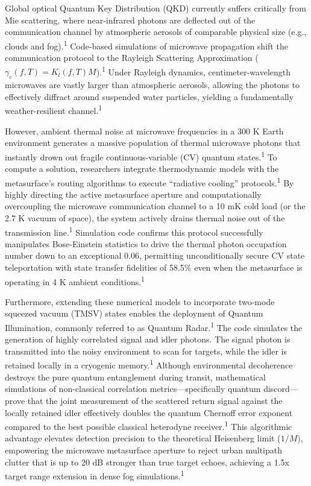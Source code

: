 \documentclass[11pt, a4paper]{article}
\begin{document}
Global optical Quantum Key Distribution (QKD) currently suffers critically from Mie scattering, where near-infrared photons are deflected out of the communication channel by atmospheric aerosols of comparable physical size (e.g., clouds and fog).\textsuperscript{1} Code-based simulations of microwave propagation shift the communication protocol to the Rayleigh Scattering Approximation ($\gamma_c(f,T) = K_l(f,T)M$).\textsuperscript{1} Under Rayleigh dynamics, centimeter-wavelength microwaves are vastly larger than atmospheric aerosols, allowing the photons to effectively diffract around suspended water particles, yielding a fundamentally weather-resilient channel.\textsuperscript{1}

However, ambient thermal noise at microwave frequencies in a 300 K Earth environment generates a massive population of thermal microwave photons that instantly drown out fragile continuous-variable (CV) quantum states.\textsuperscript{1} To compute a solution, researchers integrate thermodynamic models with the metasurface's routing algorithms to execute ``radiative cooling'' protocols.\textsuperscript{1} By highly directing the active metasurface aperture and computationally overcoupling the microwave communication channel to a 10 mK cold load (or the 2.7 K vacuum of space), the system actively drains thermal noise out of the transmission line.\textsuperscript{1} Simulation code confirms this protocol successfully manipulates Bose-Einstein statistics to drive the thermal photon occupation number down to an exceptional 0.06, permitting unconditionally secure CV state teleportation with state transfer fidelities of 58.5\% even when the metasurface is operating in 4 K ambient conditions.\textsuperscript{1}

Furthermore, extending these numerical models to incorporate two-mode squeezed vacuum (TMSV) states enables the deployment of Quantum Illumination, commonly referred to as Quantum Radar.\textsuperscript{1} The code simulates the generation of highly correlated signal and idler photons. The signal photon is transmitted into the noisy environment to scan for targets, while the idler is retained locally in a cryogenic memory.\textsuperscript{1} Although environmental decoherence destroys the pure quantum entanglement during transit, mathematical simulations of non-classical correlation metrics---specifically quantum discord---prove that the joint measurement of the scattered return signal against the locally retained idler effectively doubles the quantum Chernoff error exponent compared to the best possible classical heterodyne receiver.\textsuperscript{1} This algorithmic advantage elevates detection precision to the theoretical Heisenberg limit ($1/M$), empowering the microwave metasurface aperture to reject urban multipath clutter that is up to 20 dB stronger than true target echoes, achieving a 1.5x target range extension in dense fog simulations.\textsuperscript{1}
\end{document}
